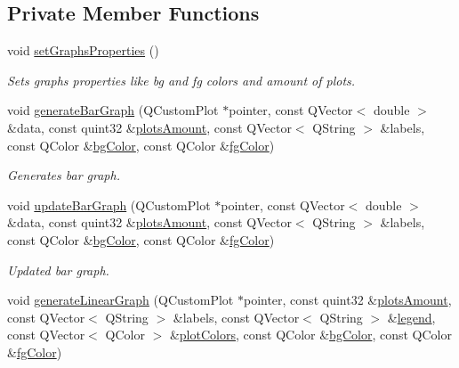 \subsection*{Private Member Functions}
\begin{DoxyCompactItemize}
\item 
void \mbox{\hyperlink{class_main_window_a9a1bad7a80ca8e1c5075d80143957754}{set\+Graphs\+Properties}} ()
\begin{DoxyCompactList}\small\item\em Sets graphs properties like bg and fg colors and amount of plots. \end{DoxyCompactList}\item 
void \mbox{\hyperlink{class_main_window_aa7a185d6aecfa15957d6fbfa0c42330b}{generate\+Bar\+Graph}} (Q\+Custom\+Plot $\ast$pointer, const Q\+Vector$<$ double $>$ \&data, const quint32 \&\mbox{\hyperlink{class_main_window_a390ce6d302bff7952eee7d92a6cf3da3}{plots\+Amount}}, const Q\+Vector$<$ Q\+String $>$ \&labels, const Q\+Color \&\mbox{\hyperlink{class_main_window_a4a1005daadc7447af6907c57b54e41ab}{bg\+Color}}, const Q\+Color \&\mbox{\hyperlink{class_main_window_a1f5455abfb51d7c4733bfad76ac60606}{fg\+Color}})
\begin{DoxyCompactList}\small\item\em Generates bar graph. \end{DoxyCompactList}\item 
void \mbox{\hyperlink{class_main_window_a1e61f5c68914afa9a1054cbb9982cf17}{update\+Bar\+Graph}} (Q\+Custom\+Plot $\ast$pointer, const Q\+Vector$<$ double $>$ \&data, const quint32 \&\mbox{\hyperlink{class_main_window_a390ce6d302bff7952eee7d92a6cf3da3}{plots\+Amount}}, const Q\+Vector$<$ Q\+String $>$ \&labels, const Q\+Color \&\mbox{\hyperlink{class_main_window_a4a1005daadc7447af6907c57b54e41ab}{bg\+Color}}, const Q\+Color \&\mbox{\hyperlink{class_main_window_a1f5455abfb51d7c4733bfad76ac60606}{fg\+Color}})
\begin{DoxyCompactList}\small\item\em Updated bar graph. \end{DoxyCompactList}\item 
void \mbox{\hyperlink{class_main_window_a2f9acdc998f6f84d2b14d7feda97133c}{generate\+Linear\+Graph}} (Q\+Custom\+Plot $\ast$pointer, const quint32 \&\mbox{\hyperlink{class_main_window_a390ce6d302bff7952eee7d92a6cf3da3}{plots\+Amount}}, const Q\+Vector$<$ Q\+String $>$ \&labels, const Q\+Vector$<$ Q\+String $>$ \&\mbox{\hyperlink{class_main_window_a80e2a1a6949dc004e0729bdb133497dd}{legend}}, const Q\+Vector$<$ Q\+Color $>$ \&\mbox{\hyperlink{class_main_window_af05a0194c683ce9a5abb789e636494da}{plot\+Colors}}, const Q\+Color \&\mbox{\hyperlink{class_main_window_a4a1005daadc7447af6907c57b54e41ab}{bg\+Color}}, const Q\+Color \&\mbox{\hyperlink{class_main_window_a1f5455abfb51d7c4733bfad76ac60606}{fg\+Color}})

\end{DoxyCompactItemize}

